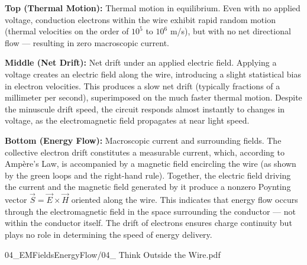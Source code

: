 \begin{SideNotePage}{
  \textbf{Top (Thermal Motion):} Thermal motion in equilibrium. Even with no applied voltage, conduction electrons within the wire exhibit rapid random motion (thermal velocities on the order of $10^5$ to $10^6$ m/s), but with no net directional flow — resulting in zero macroscopic current. \par
  \textbf{Middle (Net Drift):} Net drift under an applied electric field. Applying a voltage creates an electric field along the wire, introducing a slight statistical bias in electron velocities. This produces a slow net drift (typically fractions of a millimeter per second), superimposed on the much faster thermal motion. Despite the minuscule drift speed, the circuit responds almost instantly to changes in voltage, as the electromagnetic field propagates at near light speed. \par
  \textbf{Bottom (Energy Flow):} Macroscopic current and surrounding fields. The collective electron drift constitutes a measurable current, which, according to Ampère’s Law, is accompanied by a magnetic field encircling the wire (as shown by the green loops and the right-hand rule). Together, the electric field driving the current and the magnetic field generated by it produce a nonzero Poynting vector $\vec{S} = \vec{E} \times \vec{H}$ oriented along the wire. This indicates that energy flow occurs through the electromagnetic field in the space surrounding the conductor — not within the conductor itself. The drift of electrons ensures charge continuity but plays no role in determining the speed of energy delivery.
}{04_EMFieldsEnergyFlow/04_ Think Outside the Wire.pdf}
\end{SideNotePage}
